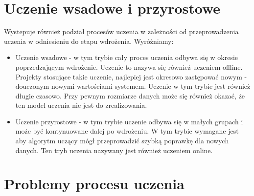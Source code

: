 \documentclass[10pt,a4paper]{book}
\begin{document}
\section{Uczenie wsadowe i przyrostowe}

Wystepuje również podział procesów uczenia w zależności od przeprowadzenia uczenia w odniesieniu do etapu wdrożenia. Wyróżniamy:

\begin{itemize}
\item Uczenie wsadowe - w tym trybie cały proces uczenia odbywa się w okresie poprzedzającym wdrożenie. Uczenie to nazywa się również uczeniem offline. Projekty stosujące takie uczenie, najlepiej jest okresowo zastępować nowym - douczonym nowymi wartościami systemem. Uczenie w tym trybie jest również długie czasowo. Przy pewnym rozmiarze danych może się również okazać, że ten model uczenia nie jest do zrealizowania.
\item Uczenie przyrostowe - w tym trybie uczenie odbywa się w małych grupach i może być kontynuowane dalej po wdrożeniu. W tym trybie wymagane jest aby algorytm uczący mógł przeprowadzić szybką poprawkę dla nowych danych. Ten tryb uczenia nazywany jest również uczeniem online.
\end{itemize}

\section{Problemy procesu uczenia}
\end{document}
